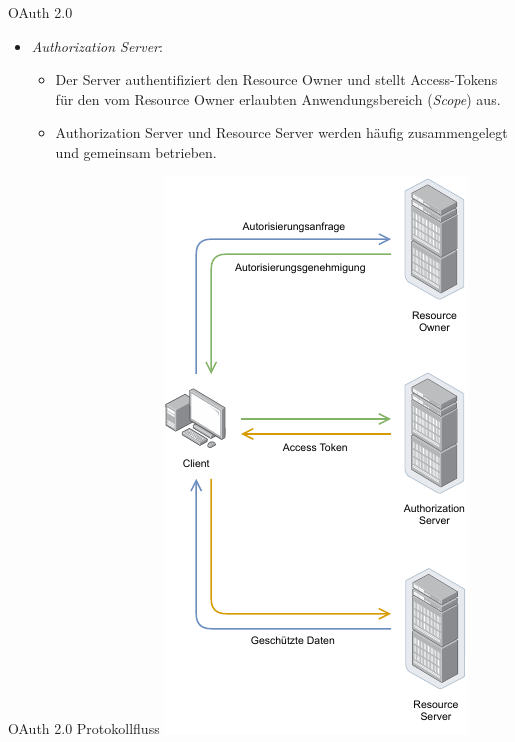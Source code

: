 \begin{defi}{OAuth 2.0}
\begin{itemize}
\begin{itemize}
              \end{itemize}
        \item \emph{Authorization Server}:
              \begin{itemize}
                  \item Der Server authentifiziert den Resource Owner und stellt Access-Tokens für den vom Resource Owner erlaubten Anwendungsbereich (\emph{Scope}) aus.
                  \item Authorization Server und Resource Server werden häufig zusammengelegt und gemeinsam betrieben.
              \end{itemize}
    \end{itemize}
\end{defi}

\begin{bonus}{OAuth 2.0 Protokollfluss}
    \centering
    \includegraphics[width=.5\textwidth]{includes/figures/bonus_oauth2.pdf}
\end{bonus}

